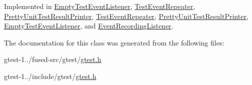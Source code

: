 \-Implemented in \hyperlink{classtesting_1_1EmptyTestEventListener_a4ee6b680b188b358efdd3705aaa67c66}{\-Empty\-Test\-Event\-Listener}, \hyperlink{classtesting_1_1internal_1_1TestEventRepeater_ae19a0ede8525bdc3ec6e05725004769b}{\-Test\-Event\-Repeater}, \hyperlink{classtesting_1_1internal_1_1PrettyUnitTestResultPrinter_abc248085e6dcbfc41789bd620e5bdbae}{\-Pretty\-Unit\-Test\-Result\-Printer}, \hyperlink{classtesting_1_1internal_1_1TestEventRepeater_ae19a0ede8525bdc3ec6e05725004769b}{\-Test\-Event\-Repeater}, \hyperlink{classtesting_1_1internal_1_1PrettyUnitTestResultPrinter_ae19a0ede8525bdc3ec6e05725004769b}{\-Pretty\-Unit\-Test\-Result\-Printer}, \hyperlink{classtesting_1_1EmptyTestEventListener_a4ee6b680b188b358efdd3705aaa67c66}{\-Empty\-Test\-Event\-Listener}, and \hyperlink{classtesting_1_1internal_1_1EventRecordingListener_a4ee6b680b188b358efdd3705aaa67c66}{\-Event\-Recording\-Listener}.



\-The documentation for this class was generated from the following files\-:\begin{DoxyCompactItemize}
\item 
gtest-\/1../fused-\/src/gtest/\hyperlink{fused-src_2gtest_2gtest_8h}{gtest.\-h}\item 
gtest-\/1../include/gtest/\hyperlink{include_2gtest_2gtest_8h}{gtest.\-h}\end{DoxyCompactItemize}
